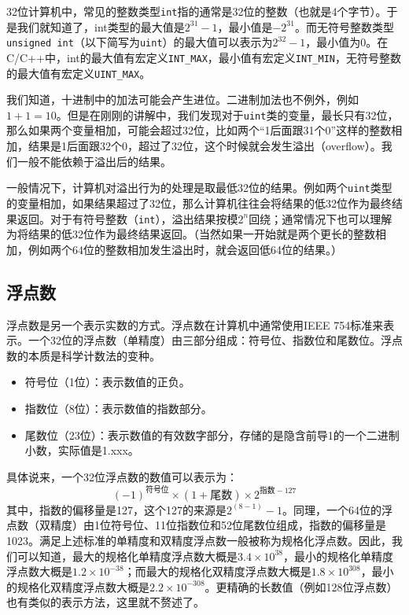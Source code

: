 \documentclass[../main.tex]{subfiles}
\begin{document}
32位计算机中，常见的整数类型\texttt{int}指的通常是32位的整数（也就是4个字节）。于是我们就知道了，int类型的最大值是$2^{31}-1$，最小值是$-2^{31}$。而无符号整数类型\texttt{unsigned int}（以下简写为\texttt{uint}）的最大值可以表示为$2^{32}-1$，最小值为0。在C/C++中，int的最大值有宏定义\texttt{INT\_MAX}，最小值有宏定义\texttt{INT\_MIN}，无符号整数的最大值有宏定义\texttt{UINT\_MAX}。

我们知道，十进制中的加法可能会产生进位。二进制加法也不例外，例如$1+1=10$。但是在刚刚的讲解中，我们发现对于\texttt{uint}类的变量，最长只有32位，那么如果两个变量相加，可能会超过32位，比如两个“1后面跟31个0”这样的整数相加，结果是1后面跟32个0，超过了32位，这个时候就会发生溢出（overflow）。我们一般不能依赖于溢出后的结果。

一般情况下，计算机对溢出行为的处理是取最低32位的结果。例如两个\texttt{uint}类型的变量相加，如果结果超过了32位，那么计算机往往会将结果的低32位作为最终结果返回。对于有符号整数（\texttt{int}），溢出结果按模$2^n$回绕；通常情况下也可以理解为将结果的低32位作为最终结果返回。（当然如果一开始就是两个更长的整数相加，例如两个64位的整数相加发生溢出时，就会返回低64位的结果。）

\subsection{浮点数}

浮点数是另一个表示实数的方式。浮点数在计算机中通常使用IEEE 754标准来表示。一个32位的浮点数（单精度）由三部分组成：符号位、指数位和尾数位。浮点数的本质是科学计数法的变种。
\begin{itemize}
  \item 符号位（1位）：表示数值的正负。
  \item 指数位（8位）：表示数值的指数部分。
  \item 尾数位（23位）：表示数值的有效数字部分，存储的是隐含前导1的一个二进制小数，实际值是1.xxx。
\end{itemize}

具体说来，一个32位浮点数的数值可以表示为：
$$(-1)^{\text{符号位}} \times (1 + \text{尾数}) \times 2^{\text{指数} - 127}$$
其中，指数的偏移量是127，这个127的来源是$2^{(8-1)} - 1$。同理，一个64位的浮点数（双精度）由1位符号位、11位指数位和52位尾数位组成，指数的偏移量是1023。满足上述标准的单精度和双精度浮点数一般被称为规格化浮点数。因此，我们可以知道，最大的规格化单精度浮点数大概是$3.4 \times 10^{38}$，最小的规格化单精度浮点数大概是$1.2 \times 10^{-38}$；而最大的规格化双精度浮点数大概是$1.8 \times 10^{308}$，最小的规格化双精度浮点数大概是$2.2 \times 10^{-308}$。更精确的长数值（例如128位浮点数）也有类似的表示方法，这里就不赘述了。
\end{document}
